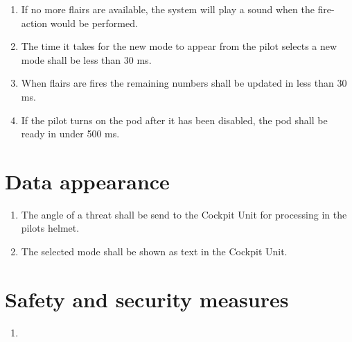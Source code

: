 \documentclass[Main]{subfiles}
\begin{document}
\begin{enumerate}[label=\bfseries DDD-2.\arabic*:]

\item If no more flairs are available, the system will play a sound when the fire-action would be performed.

\item The time it takes for the new mode to appear from the pilot selects a new mode shall be less than 30 ms.

\item When flairs are fires the remaining numbers shall be updated in less than 30 ms.

\item If the pilot turns on the pod after it has been disabled, the pod shall be ready in under 500 ms.

\end{enumerate}

\section{Data appearance}

\begin{enumerate}[label=\bfseries DDD-3.\arabic*:]

\item The angle of a threat shall be send to the Cockpit Unit for processing in the pilots helmet.

\item The selected mode shall be shown as text in the Cockpit Unit.

\end{enumerate}

\section{Safety and security measures}

\begin{enumerate}[label=\bfseries DDD-4.\arabic*:]

\item 

\end{enumerate}
\end{document}

